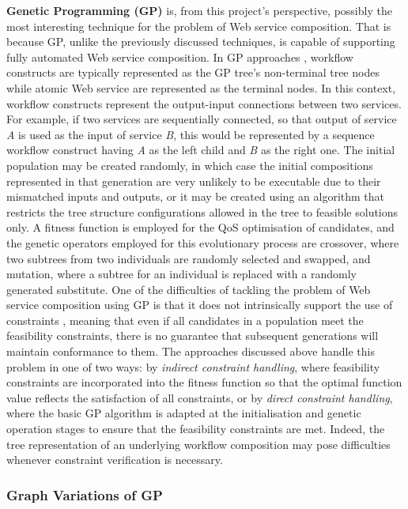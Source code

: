 \textbf{Genetic Programming (GP)} is, from this project's perspective, possibly the most interesting technique for the problem of Web service composition. That is because GP, unlike the previously discussed techniques, is capable of supporting fully automated Web service composition. In GP approaches \cite{aversano2006genetic,rodriguez2010composition}, workflow constructs are typically represented as the GP tree's non-terminal tree nodes while atomic Web service are represented as the terminal nodes. In this context, workflow constructs represent the output-input connections between two services. For example, if two services are sequentially connected, so that output of service \textit{A} is used as the input of service \textit{B}, this would be represented by a sequence workflow construct having \textit{A} as the left child and \textit{B} as the right one. The initial population may be created randomly, in which case the initial compositions represented in that generation are very unlikely to be executable due to their mismatched inputs and outputs, or it may be created using an algorithm that restricts the tree structure configurations allowed in the tree to feasible solutions only. A fitness function is employed for the QoS optimisation of candidates, and the genetic operators employed for this evolutionary process are crossover, where two subtrees from two individuals are randomly selected and swapped, and mutation, where a subtree for an individual is replaced with a randomly generated substitute. One of the difficulties of tackling the problem of Web service composition using GP is that it does not intrinsically support the use of constraints \cite{craenen2001handle}, meaning that even if all candidates in a population meet the feasibility constraints, there is no guarantee that subsequent generations will maintain conformance to them. The approaches discussed above handle this problem in one of two ways: by \textit{indirect constraint handling}, where feasibility constraints are incorporated into the fitness function so that the optimal function value reflects the satisfaction of all constraints, or by \textit{direct constraint handling}, where the basic GP algorithm is adapted at the initialisation and genetic operation stages to ensure that the feasibility constraints are met. Indeed, the tree representation of an underlying workflow composition may pose difficulties whenever constraint verification is necessary.

\subsubsection{Graph Variations of GP}

